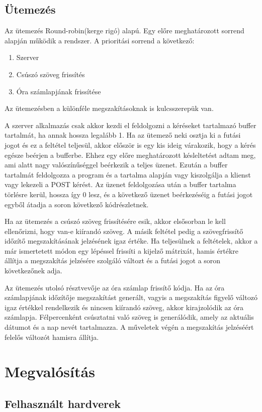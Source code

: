 \documentclass[a4paper, 12pt]{article}
\begin{document}
\subsection{Ütemezés}
Az ütemezés Round-robin(kerge rigó) alapú. Egy előre meghatározott sorrend alapján működik a rendszer. A prioritási sorrend a következő:
\begin{enumerate}
	\item Szerver
	\item Csúszó szöveg frissítés
	\item Óra számlapjának frissítése
\end{enumerate}
Az ütemezésben a különféle megszakításoknak is kulcsszerepük van.

A szerver alkalmazás csak akkor kezdi el feldolgozni a kéréseket tartalmazó buffer tartalmát, ha annak hossza legalább 1. Ha az ütemező neki osztja ki a futási jogot és ez a feltétel teljesül, akkor először is egy kis ideig várakozik, hogy a kérés egésze beérjen a bufferbe. Ehhez egy előre meghatározott késleltetést adtam meg, ami alatt nagy valószínűséggel beérkezik a teljes üzenet. Ezután a buffer tartalmát feldolgozza a program és a tartalma alapján vagy kiszolgálja a klienst vagy lekezeli a POST kérést. Az üzenet feldolgozása után a buffer tartalma törlésre kerül, hossza így 0 lesz, és a következő üzenet beérkezéséig a futási jogot egyből átadja a soron következő kódrészletnek.

Ha az ütemezés a csúszó szöveg frissítésére esik, akkor elsősorban le kell ellenőrizni, hogy van-e kiírandó szöveg. A másik feltétel pedig a szövegfrissítő időzítő megszakításának jelzésének igaz értéke. Ha teljesülnek a feltételek, akkor a már ismertetett módon egy lépéssel frissíti a kijelző mátrixát, hamis értékre állítja a megszakítás jelzésére szolgáló változt és a futási jogot a soron következőnek adja.

Az ütemezés utolsó résztvevője az óra számlap frissítő kódja. Ha az óra számlapjának időzítője megszakítást generált, vagyis a megszakítás figyelő változó igaz értékkel rendelkezik és nincsen kiírandó szöveg, akkor kirajzolódik az óra számlapja. Félpercenként csúsztatni való szöveg is generálódik, amely az aktuális dátumot és a nap nevét tartalmazza. A műveletek végén a megszakítás jelzéséért felelős változót hamisra állítja.

\section{Megvalósítás}
\subsection{Felhasznált hardverek}
\end{document}
